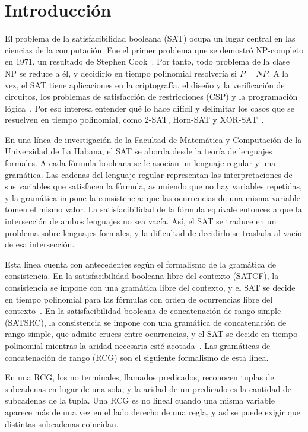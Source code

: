 
\chapter*{Introducción}\label{chapter:introduction}

El problema de la satisfacibilidad booleana (SAT) ocupa un lugar central
en las ciencias de la computación. Fue el primer problema que se demostró
NP-completo en 1971, un resultado de Stephen Cook~\cite{cook1971}. Por
tanto, todo problema de la clase NP se
reduce a él, y decidirlo en tiempo polinomial resolvería si $P = NP$. A la vez, el SAT tiene aplicaciones en la criptografía, el diseño y la
verificación de circuitos, los problemas de satisfacción de restricciones
(CSP) y la programación lógica~\cite{gu1997sat}.
Por eso interesa entender qué lo hace difícil y delimitar los casos que
se resuelven en tiempo polinomial, como 2-SAT, Horn-SAT y
XOR-SAT~\cite{schaefer1978}.

En una línea de investigación de la Facultad de Matemática y Computación
de la Universidad de La Habana, el SAT se aborda desde la teoría de
lenguajes formales. A cada fórmula booleana se le asocian un lenguaje
regular y una gramática. Las cadenas del lenguaje regular representan
las interpretaciones de sus variables que satisfacen la fórmula,
asumiendo que no hay variables repetidas, y la gramática impone la
consistencia: que las ocurrencias de una misma variable tomen el mismo
valor. La satisfacibilidad de la fórmula
equivale entonces a que la intersección de ambos lenguajes no sea vacía.
Así, el SAT se traduce en un problema sobre lenguajes formales, y la
dificultad de decidirlo se traslada al vacío de esa intersección.

Esta línea cuenta con antecedentes según el formalismo de la gramática de
consistencia. En la satisfacibilidad booleana libre del contexto (SATCF),
la consistencia se impone con una gramática libre del contexto, y el SAT
se decide en tiempo polinomial para las fórmulas con orden de ocurrencias
libre del contexto~\cite{fernandezarias2007}. En la satisfacibilidad
booleana de concatenación de rango simple (SATSRC), la consistencia se
impone con una gramática de concatenación de rango simple, que admite
cruces entre ocurrencias, y el SAT se decide en tiempo polinomial
mientras la aridad necesaria esté acotada~\cite{aguileralopez2016}. Las
gramáticas de concatenación de rango (RCG) son el siguiente formalismo de
esta línea.

En una RCG, los no terminales, llamados predicados, reconocen tuplas
de subcadenas en lugar de una sola, y la aridad de un predicado es la
cantidad de subcadenas de la tupla. Una RCG es no lineal cuando una
misma variable aparece más de una vez en el lado derecho de una regla,
y así se puede exigir que distintas subcadenas coincidan.

